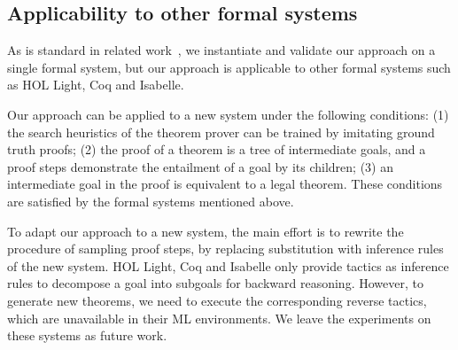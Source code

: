 \documentclass{article}
\begin{document}
\subsection{Applicability to other formal systems}
As is standard in related work~\cite{loos2017deep, irving2016deepmath, kaliszyk2018reinforcement, yang2019coqgym}, we instantiate and validate our approach on a single formal system, but our approach
 is applicable to other formal systems such as HOL Light, Coq and Isabelle. 

Our approach can be applied to a new system under the following conditions: (1) the search heuristics of the theorem prover can be trained by imitating ground truth proofs;
(2) the proof of a theorem is a tree of intermediate goals, 
and a proof steps demonstrate the entailment of a goal by its children;
(3) an intermediate goal in the proof is equivalent to a legal theorem.
These conditions are satisfied by the formal systems mentioned above.

To adapt our approach to a new system, 
the main effort is to rewrite 
the procedure of sampling proof steps,
by replacing substitution with 
 inference rules of the new system. 
HOL Light, Coq and Isabelle only provide
tactics as inference rules to decompose a goal into subgoals for backward reasoning.
However, to generate new theorems, we need to execute the corresponding reverse tactics, which are unavailable in their ML environments. 
We leave the experiments on these systems as future work.
\end{document}
